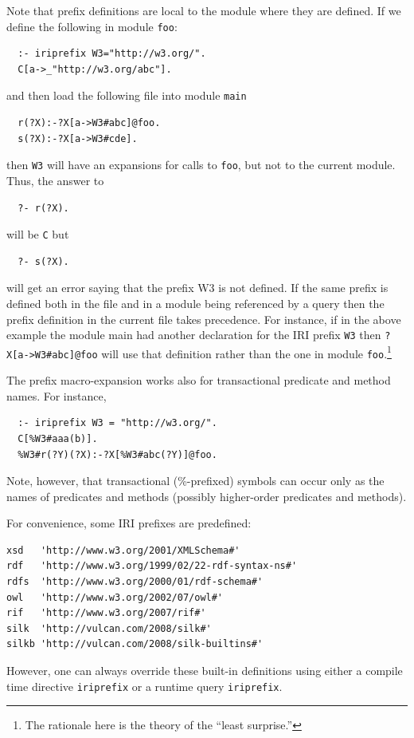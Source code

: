 \documentclass[11pt]{article}
\begin{document}
Note that prefix definitions are local to the module where they are
defined. If we define the following in module {\tt foo}:
\begin{verbatim}
  :- iriprefix W3="http://w3.org/".
  C[a->_"http://w3.org/abc"].
\end{verbatim}
and then load the following file into module {\tt main} 
\begin{verbatim}
  r(?X):-?X[a->W3#abc]@foo.
  s(?X):-?X[a->W3#cde].
\end{verbatim}
then  {\tt W3} will have an expansions for calls to \texttt{foo}, but not
to the current module. 
Thus, the answer to
\begin{verbatim}
  ?- r(?X).
\end{verbatim}
will be {\tt C} but
\begin{verbatim}
  ?- s(?X).
\end{verbatim}
will get an error saying that the prefix W3 is not defined.
If the same prefix is defined both in the file and in a module being
referenced by a query then the prefix definition in the current file takes
precedence.
For instance, if in the above example the module main had another
declaration for the IRI prefix \texttt{W3} then \texttt{?X[a->W3\#abc]@foo}
will use that definition rather than the one in module
\texttt{foo}.\footnote{
  The rationale here is the theory of the ``least surprise.''
}

The prefix macro-expansion works also for transactional predicate and
method names. For instance,
\begin{verbatim}
  :- iriprefix W3 = "http://w3.org/".
  C[%W3#aaa(b)].
  %W3#r(?Y)(?X):-?X[%W3#abc(?Y)]@foo.
\end{verbatim}
Note, however, that transactional (\%-prefixed) symbols can occur
only as the names of predicates and methods (possibly higher-order
predicates and methods).

For convenience, some IRI prefixes are predefined:
\begin{verbatim}
xsd   'http://www.w3.org/2001/XMLSchema#'
rdf   'http://www.w3.org/1999/02/22-rdf-syntax-ns#'
rdfs  'http://www.w3.org/2000/01/rdf-schema#'
owl   'http://www.w3.org/2002/07/owl#'
rif   'http://www.w3.org/2007/rif#'
silk  'http://vulcan.com/2008/silk#'
silkb 'http://vulcan.com/2008/silk-builtins#'
\end{verbatim}
However, one can always override these built-in definitions using either a
compile time directive {\tt iriprefix} or a runtime query {\tt iriprefix}.
\end{document}
